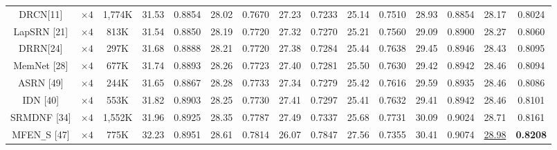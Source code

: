 \documentclass{ieeeaccess}
\begin{document}
\begin{table}
\begin{tabular}{|c|c|c|cc|cc|cc|cc|cc|cc|}
DRCN[11]& $\times4$ &1,774K& \multicolumn{1}{c|}{31.53} &0.8854  & \multicolumn{1}{c|}{28.02 } &0.7670 &\multicolumn{1}{c|}{27.23} &0.7233 & \multicolumn{1}{c|}{25.14 } &0.7510 & \multicolumn{1}{c|}{28.93 } & 0.8854
&\multicolumn{1}{c|}{28.17 } &0.8024 \\


LapSRN [21] & $\times4$ &813K& \multicolumn{1}{c|}{31.54} &0.8850 & \multicolumn{1}{c|}{28.19} &0.7720  &\multicolumn{1}{c|}{27.32} &0.7270  & \multicolumn{1}{c|}{25.21 } &0.7560   & \multicolumn{1}{c|}{29.09 } &0.8900
&\multicolumn{1}{c|}{28.27 } &0.8060 \\


DRRN[24]& $\times4$ &297K& \multicolumn{1}{c|}{31.68} &0.8888 & \multicolumn{1}{c|}{28.21} &0.7720 &\multicolumn{1}{c|}{27.38} &0.7284 & \multicolumn{1}{c|}{25.44} &0.7638 & \multicolumn{1}{c|}{29.45} & 0.8946
&\multicolumn{1}{c|}{28.43} &0.8095  \\


MemNet [28] & $\times4$ &677K& \multicolumn{1}{c|}{31.74} &0.8893& \multicolumn{1}{c|}{28.26} &0.7723 &\multicolumn{1}{c|}{27.40} &0.7281& \multicolumn{1}{c|}{25.50} &0.7630& \multicolumn{1}{c|}{29.42} & 0.8942
&\multicolumn{1}{c|}{28.46} &0.8094\\


ASRN [49]& $\times4$ &244K& \multicolumn{1}{c|}{31.65} &0.8867 & \multicolumn{1}{c|}{28.28} & 0.7733 &\multicolumn{1}{c|}{27.34} &0.7279 & \multicolumn{1}{c|}{25.42} &0.7616 & \multicolumn{1}{c|}{29.59} & 0.8935
&\multicolumn{1}{c|}{28.46} &0.8086 \\


IDN [40] & $\times4$ &553K& \multicolumn{1}{c|}{31.82} &0.8903& \multicolumn{1}{c|}{28.25} &0.7730 &\multicolumn{1}{c|}{27.41} &0.7297 & \multicolumn{1}{c|}{25.41 } & 0.7632 & \multicolumn{1}{c|}{29.41} & 0.8942
&\multicolumn{1}{c|}{28.46} &0.8101  \\


SRMDNF [34] & $\times4$ &1,552K& \multicolumn{1}{c|}{31.96 } &0.8925 & \multicolumn{1}{c|}{28.35} &0.7787 &\multicolumn{1}{c|}{27.49} &0.7337& \multicolumn{1}{c|}{25.68} &0.7731 & \multicolumn{1}{c|}{30.09} &0.9024
&\multicolumn{1}{c|}{	28.71} &0.8161 \\

MFEN\texttt{\_}S [47] & $\times4$ &775K& \multicolumn{1}{c|}{32.23} &0.8951& \multicolumn{1}{c|}{28.61} &0.7814 &\multicolumn{1}{c|}{26.07} &0.7847& \multicolumn{1}{c|}{27.56} &0.7355& \multicolumn{1}{c|}{30.41} &0.9074
&\multicolumn{1}{c|}{\color{blue}\underline{28.98}} &{\color{red}\textbf{0.8208}} \\


\end{tabular}
\end{table}
\end{document}
